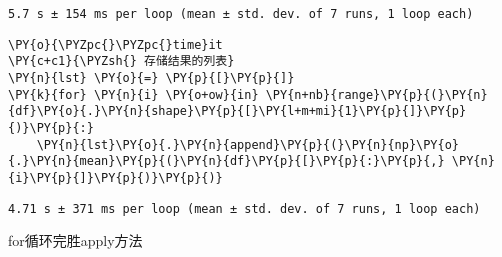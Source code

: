     \begin{Verbatim}[commandchars=\\\{\}]
5.7 s ± 154 ms per loop (mean ± std. dev. of 7 runs, 1 loop each)
    \end{Verbatim}

    \begin{tcolorbox}[breakable, size=fbox, boxrule=1pt, pad at break*=1mm,colback=cellbackground, colframe=cellborder]
\begin{Verbatim}[commandchars=\\\{\}]
\PY{o}{\PYZpc{}\PYZpc{}time}it
\PY{c+c1}{\PYZsh{} 存储结果的列表}
\PY{n}{lst} \PY{o}{=} \PY{p}{[}\PY{p}{]}
\PY{k}{for} \PY{n}{i} \PY{o+ow}{in} \PY{n+nb}{range}\PY{p}{(}\PY{n}{df}\PY{o}{.}\PY{n}{shape}\PY{p}{[}\PY{l+m+mi}{1}\PY{p}{]}\PY{p}{)}\PY{p}{:}
    \PY{n}{lst}\PY{o}{.}\PY{n}{append}\PY{p}{(}\PY{n}{np}\PY{o}{.}\PY{n}{mean}\PY{p}{(}\PY{n}{df}\PY{p}{[}\PY{p}{:}\PY{p}{,} \PY{n}{i}\PY{p}{]}\PY{p}{)}\PY{p}{)}
\end{Verbatim}
\end{tcolorbox}

    \begin{Verbatim}[commandchars=\\\{\}]
4.71 s ± 371 ms per loop (mean ± std. dev. of 7 runs, 1 loop each)
    \end{Verbatim}

    for循环完胜apply方法
